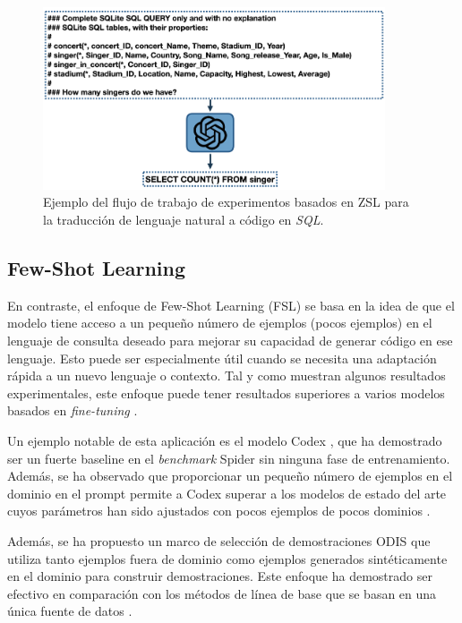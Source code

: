 \begin{figure}[H]\label{zslpromtpsql}
	\centering
	\includegraphics[width = 0.9\textwidth]{./Graphics/zslpromptsql}
	\caption{Ejemplo del flujo de trabajo de experimentos basados en ZSL para la traducción de lenguaje natural a código en \textit{SQL}.}
\end{figure} 

\subsection{Few-Shot Learning} \label{llm_approach_fsl}
	En contraste, el enfoque de Few-Shot Learning (FSL) se basa en la idea de que el modelo tiene acceso a un pequeño número de ejemplos (pocos ejemplos) en el lenguaje de consulta deseado para mejorar su capacidad de generar código en ese lenguaje. Esto puede ser especialmente útil cuando se necesita una adaptación rápida a un nuevo lenguaje o contexto. Tal y como muestran algunos resultados experimentales, este enfoque puede tener resultados superiores a varios modelos basados en \textit{fine-tuning} \cite{ftvsllmtext2sql}.

Un ejemplo notable de esta aplicación es el modelo Codex \cite{Codex}, que ha demostrado ser un fuerte baseline en el \textit{benchmark} Spider sin ninguna fase de entrenamiento. Además, se ha observado que proporcionar un pequeño número de ejemplos en el dominio en el prompt permite a Codex superar a los modelos de estado del arte cuyos parámetros han sido ajustados con pocos ejemplos de pocos dominios \cite{Codexresults}.

Además, se ha propuesto un marco de selección de demostraciones ODIS \cite{ODIS} que utiliza tanto ejemplos fuera de dominio como ejemplos generados sintéticamente en el dominio para construir demostraciones. Este enfoque ha demostrado ser efectivo en comparación con los métodos de línea de base que se basan en una única fuente de datos \cite{ODISresults}.

